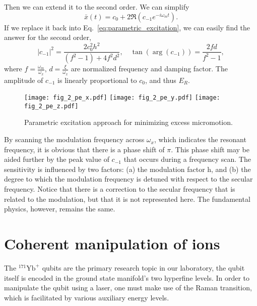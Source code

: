 Then we can extend it to the second order. We can simplify
\begin{equation}
    \bar{x}(t)=c_0+2 \Re\left(c_{-1} e^{-i \omega_m t}\right).
\end{equation}
If we replace it back into Eq.~\ref{eq:parametric_excitation}, we can easily find the answer for the second order,
\begin{equation}
    |c_{-1}|^2=\frac{2 c_0^2 h^2}{\left(f^2-1\right)+4 f^2 d^2}, \quad \tan \left(\arg \left(c_{-1}\right)\right)=\frac{2 f d}{f^2-1},
\end{equation}
where \(f=\frac{\omega_m}{\omega_x},\, d=\frac{\xi}{\omega_x}\) are normalized frequency and damping factor. The amplitude of \(c_{-1}\) is linearly proportional to \(c_0\), and thus \(E_R\).

\begin{figure}
    \centering
    {\texttt{[image: fig\_2\_pe\_x.pdf]}}
    {\texttt{[image: fig\_2\_pe\_y.pdf]}}
    {\texttt{[image: fig\_2\_pe\_z.pdf]}}
    \caption{Parametric excitation approach for minimizing excess micromotion.}
    \label{fig:fig_2_pe}
\end{figure}

By scanning the modulation frequency across \(\omega_x\), which indicates the resonant frequency, it is obvious that there is a phase shift of \(\pi\). This phase shift may be aided further by the peak value of \(c_{-1}\) that occurs during a frequency scan. The sensitivity is influenced by two factors: (a) the modulation factor h, and (b) the degree to which the modulation frequency is detuned with respect to the secular frequency. Notice that there is a correction to the secular frequency that is related to the modulation, but that it is not represented here. The fundamental physics, however, remains the same.



\section{Coherent manipulation of ions}

The ${ }^{171} \mathrm{Yb}^{+}$ qubits are the primary research topic in our laboratory, the qubit itself is encoded in the ground state manifold's two hyperfine levels. In order to manipulate the qubit using a laser, one must make use of the Raman transition, which is facilitated by various auxiliary energy levels.


